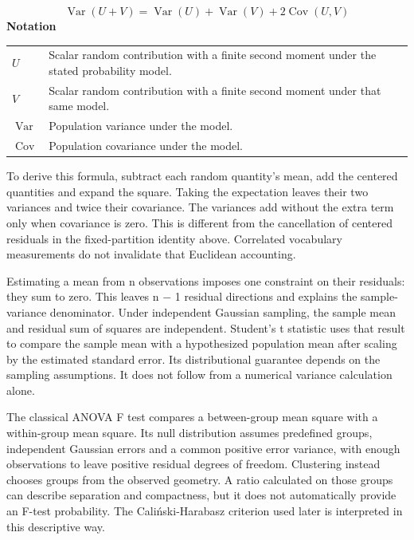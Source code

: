 \documentclass[10pt,letterpaper]{article}
\newcommand{\notlabel}{\noindent\textbf{Notation}\par\nobreak\vspace{4pt}}
\begin{document}
\par\noindent\begin{minipage}{\linewidth}
\begin{equation}\label{eq:varianceaddition}
\operatorname{Var}(U+V)=\operatorname{Var}(U)+\operatorname{Var}(V)+2\operatorname{Cov}(U,V)
\end{equation}
\notlabel
{\fontsize{8.5}{10.5}\selectfont\setlength{\tabcolsep}{0pt}\renewcommand{\arraystretch}{1.12}
\begin{tabularx}{\linewidth}{@{}p{.14\linewidth}X@{}}
$U$ & Scalar random contribution with a finite second moment under the stated probability model.\\
$V$ & Scalar random contribution with a finite second moment under that same model.\\
$\operatorname{Var}$ & Population variance under the model.\\
$\operatorname{Cov}$ & Population covariance under the model.\\
\end{tabularx}}
\par\vspace{2pt}
\end{minipage}\par
To derive this formula, subtract each random quantity's mean, add the centered quantities and expand the square. Taking the expectation leaves their two variances and twice their covariance. The variances add without the extra term only when covariance is zero. This is different from the cancellation of centered residuals in the fixed-partition identity above. Correlated vocabulary measurements do not invalidate that Euclidean accounting.\par

Estimating a mean from n observations imposes one constraint on their residuals: they sum to zero. This leaves n \ensuremath{-} 1 residual directions and explains the sample-variance denominator. Under independent Gaussian sampling, the sample mean and residual sum of squares are independent. Student's t statistic uses that result to compare the sample mean with a hypothesized population mean after scaling by the estimated standard error. Its distributional guarantee depends on the sampling assumptions. It does not follow from a numerical variance calculation alone.\par

The classical ANOVA F test compares a between-group mean square with a within-group mean square. Its null distribution assumes predefined groups, independent Gaussian errors and a common positive error variance, with enough observations to leave positive residual degrees of freedom. Clustering instead chooses groups from the observed geometry. A ratio calculated on those groups can describe separation and compactness, but it does not automatically provide an F-test probability. The Caliński-Harabasz criterion used later is interpreted in this descriptive way.\par
\end{document}

